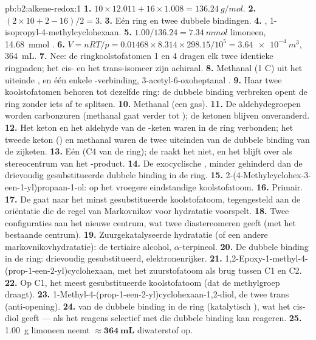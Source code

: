 \begin{solution}{pb:b2:alkene-redox:1}
\textbf{1.} $10 \times 12.011 + 16 \times 1.008 = \qty{136.24}{g/mol}$.
\textbf{2.} $(2 \times 10 + 2 - 16)/2 = 3$.
\textbf{3.} Eén ring en twee dubbele bindingen.
\textbf{4.} , 1-isopropyl-4-methylcyclohexaan.
\textbf{5.} $1.00/136.24 = \qty{7.34}{mmol}$ limoneen, \qty{14.68}{mmol} .
\textbf{6.} $V = nRT/p = 0.01468 \times 8.314 \times 298.15/10^5 = \qty{3.64e-4}{m^3}$,
\qty{364}{mL}.
\textbf{7.} Nee: de ringkoolstofatomen 1 en 4 dragen elk twee identieke ringpaden; het cis- en het
trans-isomeer zijn achiraal.
\textbf{8.} Methanal  (1 C) uit het uiteinde , en één enkele -verbinding,
3-acetyl-6-oxoheptanal .
\textbf{9.} Haar twee koolstofatomen behoren tot dezelfde ring: de dubbele binding verbreken opent de ring
zonder iets af te splitsen.
\textbf{10.} Methanal (een gas).
\textbf{11.} De aldehydegroepen worden carbonzuren (methanal gaat verder tot ); de
ketonen blijven onveranderd.
\textbf{12.} Het keton en het aldehyde van de -keten waren in de ring verbonden; het tweede
keton () en methanal waren de twee uiteinden van de dubbele binding van de zijketen.
\textbf{13.} Eén (C4 van de ring); de  raakt het niet, en het blijft over als
stereocentrum van het -product.
\textbf{14.} De exocyclische , minder gehinderd dan de drievoudig gesubstitueerde dubbele binding in de ring.
\textbf{15.} 2-(4-Methylcyclohex-3-een-1-yl)propaan-1-ol:  op het vroegere eindstandige
koolstofatoom.
\textbf{16.} Primair.
\textbf{17.} De  gaat naar het minst gesubstitueerde koolstofatoom, tegengesteld aan de oriëntatie
die de regel van Markovnikov voor hydratatie voorspelt.
\textbf{18.} Twee configuraties aan het nieuwe centrum, wat twee diastereomeren geeft (met het bestaande
centrum).
\textbf{19.} Zuurgekatalyseerde hydratatie (of een andere markovnikovhydratatie): de tertiaire alcohol,
$\alpha$-terpineol.
\textbf{20.} De dubbele binding in de ring: drievoudig gesubstitueerd, elektronenrijker.
\textbf{21.} 1,2-Epoxy-1-methyl-4-(prop-1-een-2-yl)cyclohexaan, met het zuurstofatoom als brug tussen C1 en C2.
\textbf{22.} Op C1, het meest gesubstitueerde koolstofatoom (dat de methylgroep draagt).
\textbf{23.} 1-Methyl-4-(prop-1-een-2-yl)cyclohexaan-1,2-diol, de twee  trans (anti-opening).
\textbf{24.}  van de dubbele binding in de ring (katalytisch ), wat het cis-diol
geeft --- als het reagens selectief met die dubbele binding kan reageren.
\textbf{25.} \qty{1.00}{g} limoneen neemt $\boldsymbol{\approx \qty{364}{mL}}$
diwaterstof op.
\end{solution}
